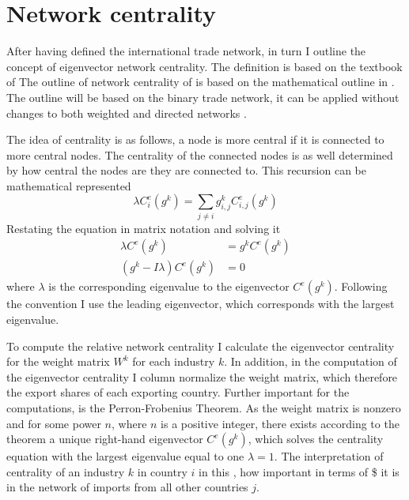  \section{Network centrality}
After having defined the international trade network, in turn I outline the concept of eigenvector network centrality. The definition is based on the textbook of \textcite{jackson2010}
The outline of  network centrality of  \textcite{jackson2010}  is based on the mathematical outline in \textcite{Bonacich77}. The outline will be based on the binary trade network, it can be applied without changes to both weighted and directed networks \parencite{jackson2010}.  \par
The idea of centrality is as follows, a node is more central if it is connected to more central nodes. The centrality of the connected nodes is as well determined by how central the nodes are they are connected to. This recursion can be mathematical represented
\[  \lambda C^e_i (g^k) = \sum_{j \neq i}  g^k_{i,j}C^e_{i,j}(g^k)  \]
Restating the equation in matrix notation and solving it
\begin{align*}
 \lambda C^e (g^k) & =  g^k C^e (g^k) \\
(g^k - I  \lambda) C^e(g^k) & = 0
 \end{align*}
where $ \lambda$ is the corresponding eigenvalue to the eigenvector $C^e(g^k)$.  Following the convention
 I use the leading eigenvector, which corresponds with the largest eigenvalue. \par
To compute the relative network centrality I calculate the eigenvector centrality for the weight matrix $W^k$ for each industry $k$.
In addition, in the computation of the eigenvector centrality I column normalize the weight matrix, which therefore  the export shares of each exporting country. Further important for the computations, is the Perron-Frobenius Theorem. As the weight matrix is nonzero and for some power $n$, where $n$ is a positive integer, there exists according to the theorem a unique right-hand eigenvector $C^e(g^k)$, which solves the centrality equation with the largest eigenvalue equal to one $\lambda = 1$.  The interpretation of
 centrality of an industry $k$ in country $i$ in this , how important in terms of \$ it is in the network of imports from all other countries $j$.

